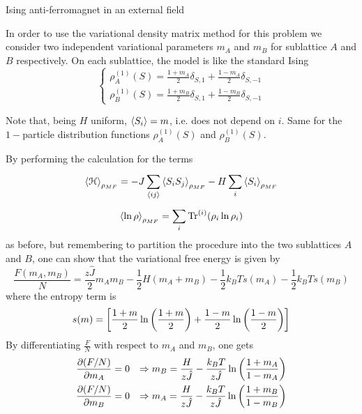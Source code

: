 \documentclass[../main/main.tex]{subfiles}
\begin{document}
\begin{example}{Ising anti-ferromagnet in an external field}{}
\begin{itemize}
In order to use the variational density matrix method for this problem we consider two independent variational parameters \( m_A \) and \( m_B \) for sublattice \( A \) and \( B \) respectively. On each sublattice, the model is like the standard Ising
\begin{equation*}
  \begin{cases}
   \rho _A^{(1)}(S) = \frac{1+m_A}{2} \delta _{S,1}+ \frac{1-m_A}{2}\delta _{S,-1}\\
   \rho _B^{(1)}(S) = \frac{1+m_B}{2} \delta _{S,1}+ \frac{1-m_B}{2}\delta _{S,-1}
  \end{cases}
\end{equation*}
\begin{remark}
Note that, being \( H \) uniform, \( \expval{S_i} = m \), i.e. does not depend on \( i \). Same for the \( 1- \)particle distribution functions \( \rho _A^{(1)}(S) \) and  \( \rho _B^{(1)}(S) \).
\end{remark}
By performing the calculation for the terms
\begin{equation*}
  \expval{\mathcal{H}}_{\rho _{MF}} = - J \sum_{\expval{ij} }^{} \expval{S_i S_j}_{\rho _{MF}} - H \sum_{i}^{} \expval{S_i}_{\rho _{MF}}
\end{equation*}
\begin{equation*}
  \expval{\ln{\rho } }_{\rho _{MF}} = \sum_{i}^{} \Tr^{(i)}(\rho _i \ln{\rho _i} )
\end{equation*}
as before, but remembering to partition the procedure into the two sublattices \( A \) and \( B \), one can show that the variational free energy is given by
\begin{equation}
  \frac{F(m_A,m_B)}{N} = \frac{z \hat{J} }{2}m_A m_B - \frac{1}{2}H (m_A+m_B)
  - \frac{1}{2} k_B T s(m_A) - \frac{1}{2}k_B T s(m_B)
\end{equation}
where the entropy term is 
\begin{equation*}
  s(m) = \qty[\frac{1+m}{2} \ln{\qty(\frac{1+m}{2}) } + \frac{1-m}{2} \ln{\qty(\frac{1-m}{2}) }  ]
\end{equation*}
By differentiating \( \frac{F}{N} \) with respect to \( m_A \) and \( m_B \), one gets
\begin{subequations}
\begin{align*}
   \pdv{(F/N)}{m_A} &= 0 & \Rightarrow m_B = \frac{H}{z \hat{J} } - \frac{k_B T}{z \hat{J} }\ln{\qty(\frac{1+m_A}{1-m_A}) } \\
   \pdv{(F/N)}{m_B} &= 0 & \Rightarrow m_A = \frac{H}{z \hat{J} } - \frac{k_B T}{z \hat{J} }\ln{\qty(\frac{1+m_B}{1-m_B}) }

\end{align*}
\end{subequations}
\end{itemize}
\end{example}
\end{document}
